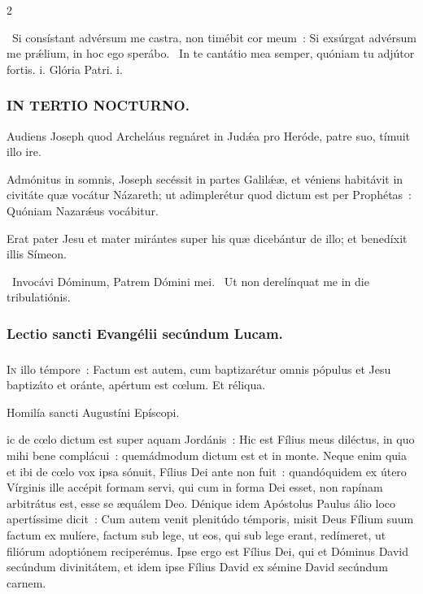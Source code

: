 \documentclass[9pt,twoside]{extarticle}
\begin{document}
\begin{multicols}{2}
{\begin{tightlist}{}
\item {}~Si consístant advérsum me castra, non timébit cor meum~: \textred{*} Si exsúrgat advérsum me prǽlium, in hoc ego sperábo. ~In te cantátio mea semper, quóniam tu adjútor fortis. i. Glória Patri. i.
\end{tightlist}

\subsubsection*{\center \textsc{IN TERTIO NOCTURNO.}}
\begin{tightlist}{}
\item {} Audiens Joseph quod Archeláus regnáret in Judǽa pro Heróde, patre suo, tímuit illo ire.
\item {} Admónitus in somnis, Joseph secéssit in partes Galilǽæ, et véniens habitávit in civitáte quæ vocátur Názareth; ut adimplerétur quod dictum est per Prophétas~: Quóniam Nazarǽus vocábitur.
\item {} Erat pater Jesu et mater mirántes super his quæ dicebántur de illo; et benedíxit illis Símeon.
\item {}~Invocávi Dóminum, Patrem Dómini mei. ~Ut non derelínquat me in die tribulatiónis.
\end{tightlist}

\subsubsection*{\center Lectio sancti Evangélii secúndum Lucam.}
\subsubsection*{\center {}}
\lettrine{I}n illo témpore~: Factum est autem, cum baptizarétur omnis pópulus et Jesu baptizáto et oránte, apértum est cœlum. Et réliqua.

\begin{center}Homilía sancti Augustíni Epíscopi.\\
\end{center}
ic de cœlo dictum est super aquam Jordánis~: Hic est Fílius meus diléctus, in quo mihi bene complácui~: quemádmodum dictum est et in monte. Neque enim quia et ibi de cœlo vox ipsa sónuit, Fílius Dei ante non fuit~: quandóquidem ex útero Vírginis ille accépit formam servi, qui cum in forma Dei esset, non rapínam arbitrátus est, esse se æquálem Deo. Dénique idem Apóstolus Paulus álio loco apertíssime dicit~: Cum autem venit plenitúdo témporis, misit Deus Fílium suum factum ex mulíere, factum sub lege, ut eos, qui sub lege erant, redímeret, ut filiórum adoptiónem reciperémus. Ipse ergo est Fílius Dei, qui et Dóminus David secúndum divinitátem, et idem ipse Fílius David ex sémine David secúndum carnem.

}
\end{multicols}
\end{document}
